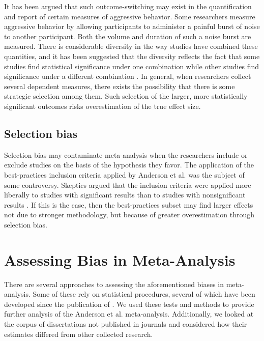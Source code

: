 \documentclass[man, mask]{apa6}
\begin{document}
It has been argued that such outcome-switching may exist in the quantification and report of certain measures of aggressive behavior. Some researchers measure aggressive behavior by allowing participants to administer a painful burst of noise to another participant. Both the volume and duration of such a noise burst are measured.  There is considerable diversity in the way studies have combined these quantities, and it has been suggested that the diversity reflects the fact that some studies find statistical significance under one combination while other studies find significance under a different combination \citep{Elson:etal:2014}.  In general, when researchers collect several dependent measures, there exists the possibility that there is some strategic selection among them. Such selection of the larger, more statistically significant outcomes risks overestimation of the true effect size. 


\subsection{Selection bias}
Selection bias may contaminate meta-analysis when the researchers include or exclude studies on the basis of the hypothesis they favor. The application of the best-practices inclusion criteria applied by Anderson et al. was the subject of some controversy. Skeptics argued that the inclusion criteria were applied more liberally to studies with significant results than to studies with nonsignificant results \citep{Ferguson:2010}. If this is the case, then the best-practices subset may find larger effects not due to stronger methodology, but because of greater overestimation through selection bias. 

\section{Assessing Bias in Meta-Analysis}
There are several approaches to assessing the aforementioned biases in meta-analysis. Some of these rely on statistical procedures, several of which have been developed since the publication of \citet{Anderson:etal:2010}. We used these tests and methods to provide further analysis of the Anderson et al. meta-analysis. Additionally, we looked at the corpus of dissertations not published in journals and considered how their estimates differed from other collected research.
\end{document}
